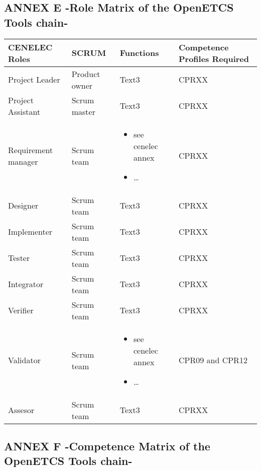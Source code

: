 \documentclass{template/openetcs_article}
\begin{document}
\subsection{ANNEX E -Role Matrix of the OpenETCS Tools chain-}
\begin{flushleft}
\tablefirsthead{}
\tablehead{}
\tabletail{}
\tablelasttail{}
\begin{supertabular}{|m{2cm}|m{2cm}|m{9cm}|m{2cm}|}
\hline
{}
CENELEC Roles &
SCRUM &
Functions &
Competence Profiles Required\\\hline
Project Leader &
Product owner &
Text3 &
CPRXX\\\hline
Project Assistant &
Scrum master &
Text3 &
CPRXX\\\hline
Requirement manager &
Scrum team &
\begin{itemize}
\item see cenelec annex
\item {\dots}
\end{itemize}
&
CPRXX\\\hline
Designer &
Scrum team &
Text3 &
CPRXX\\\hline
Implementer &
Scrum team &
Text3 &
CPRXX\\\hline
Tester &
Scrum team &
Text3 &
CPRXX\\\hline
Integrator &
Scrum team &
Text3 &
CPRXX\\\hline
Verifier &
Scrum team &
Text3 &
CPRXX\\\hline
Validator &
Scrum team &
\begin{itemize}
\item see cenelec annex
\item {\dots}
\end{itemize}
&
CPR09 and CPR12\\\hline
Assesor &
Scrum team &
Text3 &
CPRXX\\\hline
\end{supertabular}
\end{flushleft}

\subsection{ANNEX F -Competence Matrix of the OpenETCS Tools chain-}
\end{document}
